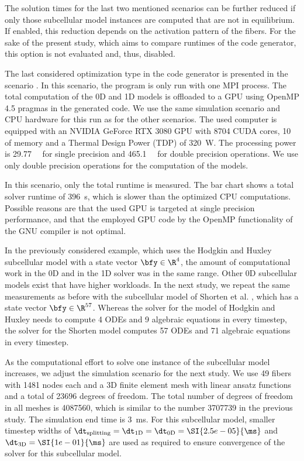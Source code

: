 The solution times for the last two mentioned scenarios can be further reduced if only those subcellular model instances are computed that are not in equilibrium. If enabled, this reduction depends on the activation pattern of the fibers. For the sake of the present study, which aims to compare runtimes of the code generator, this option is not evaluated and, thus, disabled.

The last considered optimization type in the code generator is presented in the scenario . In this scenario, the program is only run with one MPI process. The total computation of the 0D and 1D models is offloaded to a GPU using OpenMP 4.5 pragmas in the generated code. We use the same simulation scenario and CPU hardware for this run as for the other scenarios. The used computer is equipped with an NVIDIA GeForce RTX 3080 GPU with 8704 CUDA cores, \SI{10}{\giga\byte} of memory and a Thermal Design Power (TDP) of \SI{320}{\watt}. The processing power is \SI{29.77}{\tera\flops} for single precision and \SI{465.1}{\giga\flops} for double precision operations. We use only double precision operations for the computation of the models.

In this scenario, only the total runtime is measured. The bar chart shows a total solver runtime of \SI{396}{\s}, which is slower than the optimized CPU computations. Possible reasons are that the used GPU is targeted at single precision performance, and that the employed GPU code by the OpenMP functionality of the GNU compiler is not optimal.

In the previously considered example, which uses the Hodgkin and Huxley subcellular model with a state vector $\bfy \in \R^4$, the amount of computational work in the 0D and in the 1D solver was in the same range. Other 0D subcellular models exist that have higher workloads. In the next study, we repeat the same measurements as before with the subcellular model of Shorten et al. \cite{Shorten2007}, which has a state vector $\bfy \in \R^{57}$.  Whereas the solver for the model of Hodgkin and Huxley needs to compute 4 ODEs and 9 algebraic equations in every timestep, the solver for the Shorten model computes 57 ODEs and 71 algebraic equations in every timestep.

As the computational effort to solve one instance of the subcellular model increases, we adjust the simulation scenario for the next study. 
We use 49 fibers with 1481 nodes each and a 3D finite element mesh with linear ansatz functions and a total of \num{23696} degrees of freedom. The total number of degrees of freedom in all meshes is \num{4087560}, which is similar to the number \num{3707739} in the previous study. The simulation end time is \SI{3}{\ms}. For this subcellular model, smaller timestep widths of $\dt_\text{splitting}=\dt_\text{1D}=\dt_\text{0D}=\SI{2.5e-05}{\ms}$ and $\dt_\text{3D}=\SI{1e-01}{\ms}$ are used as required to ensure convergence of the solver for this subcellular model.

